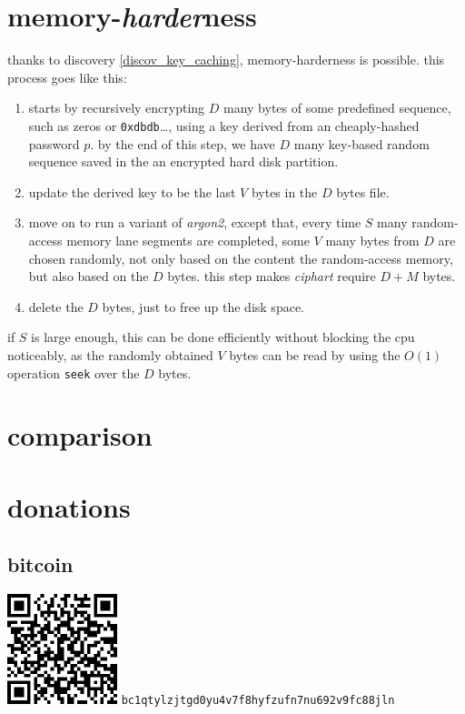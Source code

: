 \documentclass[twocolumn]{article}
\begin{document}
\section{memory-\emph{harder}ness}
thanks to discovery \ref{discov_key_caching}, memory-harderness is
possible.  this process goes like this:
\begin{enumerate}
    \item starts by recursively encrypting $D$ many bytes of some
    predefined sequence, such as zeros or \texttt{0xdbdb}\ldots, using a
    key derived from an cheaply-hashed password $p$.  by the end of this
    step, we have $D$ many key-based random sequence saved in the an
    encrypted hard disk partition.

    \item update the derived key to be the last $V$ bytes in the $D$ bytes
    file.

    \item move on to run a variant of \emph{argon2}, except that, every
    time $S$ many random-access memory lane segments are completed, some
    $V$ many bytes from $D$ are chosen randomly, not only based on the
    content the random-access memory, but also based on the $D$ bytes.
    this step makes \emph{ciphart} require $D+M$ bytes.

    \item delete the $D$ bytes, just to free up the disk space.
\end{enumerate}

if $S$ is large enough, this can be done efficiently without blocking the
cpu noticeably, as the randomly obtained $V$ bytes can be read by using
the $O(1)$ operation \texttt{seek} over the $D$ bytes.

\section{comparison}

\appendix
\section{donations}
\subsection{bitcoin}
\begin{center}
    \includegraphics[width=121px]{./pics/btc_wallet_address_trimmed.png}
    \texttt{bc1qtylzjtgd0yu4v7f8hyfzufn7nu692v9fc88jln}
\end{center}
\end{document}
